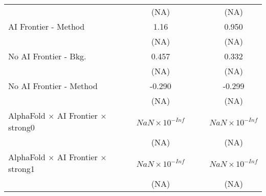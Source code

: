 \begin{tabular}{lcccccc}
                                                                              &                        &                        & (NA)                   &                        &                        & (NA)\\   
   AI Frontier - Method                                                       &                        &                        & 1.16                   &                        &                        & 0.950\\   
                                                                              &                        &                        & (NA)                   &                        &                        & (NA)\\   
   No AI Frontier - Bkg.                                                      &                        &                        & 0.457                  &                        &                        & 0.332\\   
                                                                              &                        &                        & (NA)                   &                        &                        & (NA)\\   
   No AI Frontier - Method                                                    &                        &                        & -0.290                 &                        &                        & -0.299\\   
                                                                              &                        &                        & (NA)                   &                        &                        & (NA)\\   
   AlphaFold $\times$ AI Frontier $\times$ strong0                            &                        &                        & $NaN\times 10^{-Inf}$  &                        &                        & $NaN\times 10^{-Inf}$\\    
                                                                              &                        &                        & (NA)                   &                        &                        & (NA)\\   
   AlphaFold $\times$ AI Frontier $\times$ strong1                            &                        &                        & $NaN\times 10^{-Inf}$  &                        &                        & $NaN\times 10^{-Inf}$\\    
                                                                              &                        &                        & (NA)                   &                        &                        & (NA)\\   

\end{tabular}
